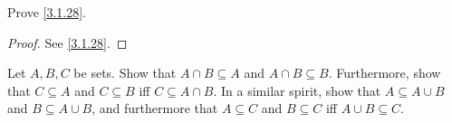 \begin{ex}\label{ex:3.1.6}
  Prove \cref{3.1.28}.
\end{ex}

\begin{proof}
  See \cref{3.1.28}.
\end{proof}

\begin{ex}\label{ex:3.1.7}
  Let \(A, B, C\) be sets.
  Show that \(A \cap B \subseteq A\) and \(A \cap B \subseteq B\).
  Furthermore, show that \(C \subseteq A\) and \(C \subseteq B\) iff \(C \subseteq A \cap B\).
  In a similar spirit, show that \(A \subseteq A \cup B\) and \(B \subseteq A \cup B\), and furthermore that \(A \subseteq C\) and \(B \subseteq C\) iff \(A \cup B \subseteq C\).
\end{ex}

